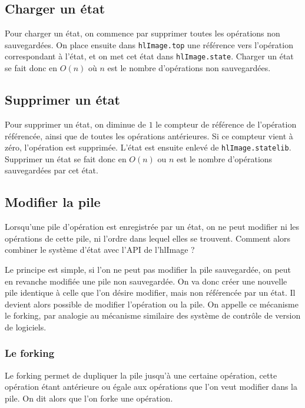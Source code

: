 		\subsection{Charger un état}
		Pour charger un état, on commence par supprimer toutes les opérations non sauvegardées. On place ensuite dans \lstinline$hlImage.top$ une
		référence vers l'opération correspondant à l'état, et on met cet état dans \lstinline$hlImage.state$. Charger un état se fait donc en
		$O(n)$ où $n$ est le nombre d'opérations non sauvegardées.
		\subsection{Supprimer un état}
		Pour supprimer un état, on diminue de $1$ le compteur de référence de l'opération référencée, ainsi que de toutes les opérations antérieures.
		Si ce compteur vient à zéro, l'opération est supprimée. L'état est ensuite enlevé de \lstinline$hlImage.statelib$.
		Supprimer un état se fait donc en $O(n)$ ou $n$ est le nombre d'opérations sauvegardées par cet état.
		\subsection{Modifier la pile}
		Lorsqu'une pile d'opération est enregistrée par un état, on ne peut modifier ni les opérations de cette pile, ni l'ordre dans lequel elles
		se trouvent. Comment alors combiner le système d'état avec l'API de l'hlImage ? 

		Le principe est simple, si l'on ne peut pas modifier la pile sauvegardée, on peut en revanche modifiée une pile non sauvegardée. 
		On va donc créer une nouvelle pile identique à celle que l'on désire modifier, mais non référencée par un état.
		Il devient alors possible de modifier l'opération ou la pile. On appelle ce mécanisme le forking, par analogie au mécanisme
		similaire des système de contrôle de version de logiciels.
		
		\subsubsection{Le forking}
			Le forking permet de dupliquer la pile jusqu'à une certaine opération, cette opération étant antérieure ou égale aux opérations que
			l'on veut modifier dans la pile. On dit alors que l'on forke une opération.

